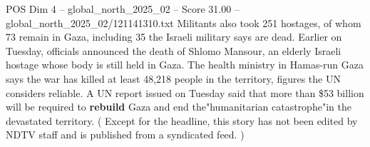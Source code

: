 \begin{textsample}{POS Dim 4 – global\_north\_2025\_02 – Score 31.00 – global\_north\_2025\_02/121141310.txt}
Militants also took 251 hostages, of whom 73 remain in Gaza, including 35 the Israeli military says are dead.
Earlier on Tuesday, officials announced the death of Shlomo Mansour, an elderly Israeli hostage whose body is still held in Gaza.
The health ministry in Hamas-run Gaza says the war has killed at least 48,218 people in the territory, figures the UN considers reliable.
A UN report issued on Tuesday said that more than \$53 billion will be required to \textbf{rebuild} Gaza and end the"humanitarian catastrophe"in the devastated territory. ( Except for the headline, this story has not been edited by NDTV staff and is published from a syndicated feed. )

\end{textsample}
